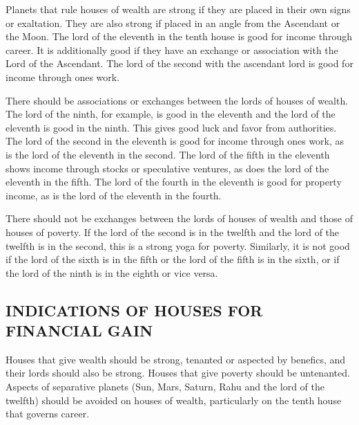            

Planets that rule houses of wealth are strong if they are placed in their own signs or exaltation. They are also strong if placed in an angle from the Ascendant or the Moon. The lord of the eleventh in the tenth house is good for income through career. It is additionally good if they have an exchange or association with the Lord of the Ascendant. The lord of the second with the ascendant lord is good for income through ones work.

 

There should be associations or exchanges between the lords of houses of wealth. The lord of the ninth, for example, is good in the eleventh and the lord of the eleventh is good in the ninth. This gives good luck and favor from authorities. The lord of the second in the eleventh is good for income through ones work, as is the lord of the eleventh in the second. The lord of the fifth in the eleventh shows income through stocks or speculative ventures, as does the lord of the eleventh in the fifth. The lord of the fourth in the eleventh is good for property income, as is the lord of the eleventh in the fourth. 

 

There should not be exchanges between the lords of houses of wealth and those of houses of poverty. If the lord of the second is in the twelfth and the lord of the twelfth is in the second, this is a strong yoga for poverty. Similarly, it is not good if the lord of the sixth is in the fifth or the lord of the fifth is in the sixth, or if the lord of the ninth is in the eighth or vice versa.    

 

\subsection{INDICATIONS OF HOUSES FOR FINANCIAL GAIN}

 

Houses that give wealth should be strong, tenanted or aspected by benefics, and their lords should also be strong. Houses that give poverty should be untenanted.
Aspects of separative planets (Sun, Mars, Saturn, Rahu and the lord of the twelfth) should be avoided on houses of wealth, particularly on the tenth house that governs career.
 

